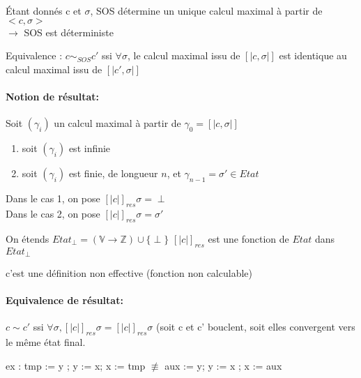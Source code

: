 \documentclass[10pt,a4paper]{article}
\newcommand{\sem}[1]{$\left[| #1 | \right]$}
\newcommand{\semm}[1]{\left[| #1 | \right]}
\newcommand{\V}{\mathbb{V}}
\newcommand{\Z}{\mathbb{Z}}
\begin{document}
\begin{thm}{}Étant donnés c et $\sigma$, SOS détermine un unique calcul maximal à partir de $<c, \sigma >$\\
 $\rightarrow$ SOS est déterministe\\
 \end{thm}
 
 \begin{definition}{Equivalence : }
 $ c \sim_{SOS} c'$ ssi $\forall \sigma$, le calcul maximal issu de \sem{c , \sigma} est  identique au calcul maximal issu de \sem{c', \sigma}\\
 \end{definition}
 


\paragraph*{Notion de résultat:}
\begin{thm}{} Soit $(\gamma_i)$ un calcul maximal à partir de $\gamma_0 = \semm{c, \sigma }$
\begin{enumerate}
\item soit $(\gamma_i)$ est infinie
\item soit $(\gamma_i )$ est finie, de longueur $n$, et $\gamma_{n-1} = \sigma' \in Etat$
\end{enumerate}
Dans le cas 1, on pose $\semm{ c }_{res} \sigma = \perp$\\
Dans le cas 2, on pose $\semm{ c }_{res} \sigma  = \sigma'$\\
\end{thm}


On étends $Etat_{\perp} = (\V \rightarrow \Z) \cup \{ \perp \}$
$\semm{ c }_{res}$ est une fonction de $Etat$ dans $Etat_{\perp}$
\begin{rem}{} c'est une définition non effective (fonction non calculable)
\end{rem}


\paragraph{Equivalence de résultat:}
\begin{definition}{} $c \sim c'$ ssi $\forall \sigma, \semm{ c }_{res} \sigma = \semm{ c }_{res} \sigma$
(soit c et c' bouclent, soit elles convergent vers le m\^eme état final.\\
\end{definition}

ex : tmp := y ; y := x; x := tmp $\not \equiv$ aux := y; y := x ; x := aux
\end{document}
